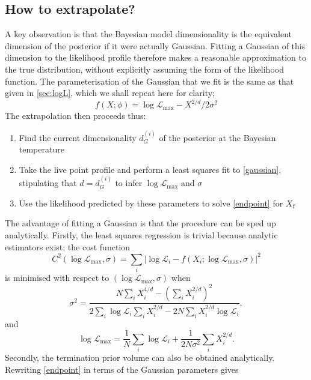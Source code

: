 \documentclass[usenatbib]{mnras}
\newcommand{\Like}{\mathcal{L}}
\newcommand{\logLmax}{\log \Like_\mathrm{max}}
\begin{document}
\subsection{How to extrapolate?}
A key observation is that the Bayesian model dimensionality is the equivalent dimension of the posterior if it were actually Gaussian. Fitting a Gaussian of this dimension to the likelihood profile therefore makes a reasonable approximation to the true distribution, without explicitly assuming the form of the likelihood function. The parameterisation of the Gaussian that we fit is the same as that given in \cref{sec:logL}, which we shall repeat here for clarity;
\begin{equation}\label{gaussian}
    f(X; \phi) = \logLmax - X^{2/d}/2\sigma^2
\end{equation}
The extrapolation then proceeds thus:
\begin{enumerate}[leftmargin=*]
    \item Find the current dimensionality ${d}^{(i)}_G$ of the posterior at the Bayesian temperature
    \item Take the live point profile and perform a least squares fit to \eqref{gaussian}, stipulating that $d = {d}^{(i)}_G$ to infer $\logLmax$ and $\sigma$ 
    \item Use the likelihood predicted by these parameters to solve \eqref{endpoint} for $X_\mathrm{f}$
\end{enumerate}
The advantage of fitting a Gaussian is that the procedure can be sped up analytically. Firstly, the least squares regression is trivial because analytic estimators exist; the cost function 
\begin{equation}\label{chi squared}
	C^2(\logLmax, \sigma) = \sum_i \left| \log \Like_i - f(X_i; \logLmax, \sigma) \right| ^2
\end{equation}
is minimised with respect to $(\logLmax, \sigma)$ when
\begin{equation}\label{eq:sigma}
    \sigma^2 = \frac{N \sum_i X_i^{4/d} - \left(\sum_i X_i^{2/d}\right)^2}{2 \sum_i \log \Like_i \sum_i X_i^{2/d} - 2N \sum_i X_i^{2/d}\log \Like_i },
\end{equation}
and
\begin{equation}\label{eq:logLmax}
    \logLmax = \frac{1}{N} \sum_i \log \mathcal{L}_i + \frac{1}{2N\sigma^2} \sum_i X_i^{2/d}.
\end{equation}
Secondly, the termination prior volume can also be obtained analytically. Rewriting \cref{endpoint} in terms of the Gaussian parameters gives
\end{document}
